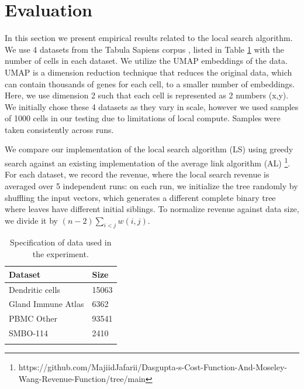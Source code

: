 \documentclass[unnumsec,webpdf,contemporary,large,numbered]{oup-authoring-template}%
\theoremstyle{thmstyleone}%
\theoremstyle{thmstyletwo}%
\theoremstyle{thmstylethree}%
\begin{document}
\section {Evaluation} \label{sec:eval}
In this section we present empirical results related to the local search algorithm. We use 4 datasets from the Tabula Sapiens corpus \cite{Quake2024.12.03.626516}, listed in Table \ref{table:datasets} with the number of cells in each dataset. We utilize the UMAP embeddings of the data. UMAP \cite{McInnes2018UMAPUM} is a dimension reduction technique that reduces the original data, which can contain thousands of genes for each cell, to a smaller number of embeddings. Here, we use dimension 2 such that each cell is represented as 2 numbers (x,y). We initially chose these 4 datasets as they vary in scale, however we used samples of 1000 cells in our testing due to limitations of local compute. Samples were taken consistently across runs.

We compare our implementation of the local search algorithm (LS) using greedy search against an existing implementation of the average link algorithm (AL) \footnote{https://github.com/MajiidJafarii/Dasgupta-s-Cost-Function-And-Moseley-Wang-Revenue-Function/tree/main}. For each dataset, we record the revenue, where the local search revenue is averaged over 5 independent runs: on each run, we initialize the tree randomly by shuffling the input vectors, which generates a different complete binary tree where leaves have different initial siblings. To normalize revenue against data size, we divide it by $(n-2)\sum_{i<j}{}{w(i,j)}$.

\begin{table}[t]
\begin{center}
\caption{Specification of data used in the experiment. \label{table:datasets}}%
\begin{tabular}{@{}ll@{}}
\toprule
Dataset & Size\\
\midrule
Dendritic cells & 15063 \\
Gland Immune Atlas & 6362  \\
PBMC Other & 93541 \\
SMBO-114 & 2410 \\
\botrule
\end{tabular}
\end{center}
\end{table}
\end{document}
